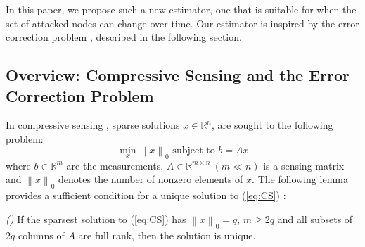 \documentclass[../../thesis.tex]{subfiles}
\newcommand{\norm}[1]{\left\lVert#1\right\rVert}
\begin{document}
In this paper, we propose such a new estimator, one that is suitable for when the set of attacked nodes can change over time. Our estimator is inspired by the error correction problem \cite{Candes_Tao}, described in the following section. %


\subsection{Overview: Compressive Sensing and the Error Correction Problem \cite{Candes_Tao}} \label{sec:error_correction}
In compressive sensing \cite{Candes_Tao}, sparse solutions $x\in \mathbb{R}^n$, are sought to the following problem:
\begin{equation}
	\min_x \norm{x}_0 \text{ subject to } b= Ax
	\label{eq:CS}
\end{equation}
where $b \in \mathbb{R}^m$ are the measurements, $A \in \mathbb{R}^{m\times n}~ (m \ll n)$ is a sensing matrix and $\norm{x}_0$ denotes the number of nonzero elements of $x$. The following lemma provides a sufficient condition for a unique solution to (\ref{eq:CS}) \cite{Candes_Tao}:

\begin{lem} \emph{(\hspace{1sp}\cite{David_Chang})} \label{lem:CS}
If the sparsest solution to (\ref{eq:CS}) has $\norm{x}_0 = q$, $m\ge 2q$ and all subsets of $2q$ columns of $A$ are full rank, then the solution is unique. 
\end{lem}
\end{document}
